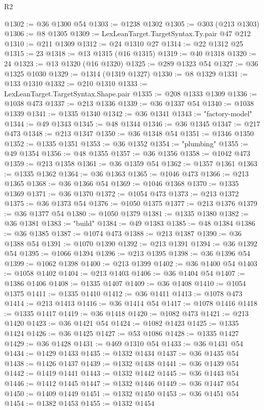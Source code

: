 \begin{lexlean}{R2}
\begin{coremodule}
@1302 := @36 @1300 @54
@1303 := @1238 @1302
@1305 := @303 (@213 @1303)
@1306 := @8 @1305
@1309 := LexLeanTarget.TargetSyntax.Ty.pair @47 @212
@1310 := @211 @1309
@1312 := @24 @1310 @27
@1314 := @22 @1312 @25
@1315 := 23
@1318 := @13 @1315 (@16 @1315)
@1319 := @40 @1318
@1320 := 24
@1323 := @13 @1320 (@16 @1320)
@1325 := @289 @1323 @54
@1327 := @36 @1325 @1030
@1329 := @1314 (@1319 @1327)
@1330 := @8 @1329
@1331 := @133 @1310
@1332 := @210 @1310
@1333 := LexLeanTarget.TargetSyntax.Shape.pair
@1335 := @208 @1333 @1309
@1336 := @1038 @473
@1337 := @213 @1336
@1339 := @36 @1337 @54
@1340 := @1038 @1339
@1341 := @1335 @1340
@1342 := @36 @1341
@1343 := "factory-model"
@1344 := @49 @1343
@1345 := @48 @1344
@1346 := @36 @1345
@1347 := @217 @473
@1348 := @213 @1347
@1350 := @36 @1348 @54
@1351 := @1346 @1350
@1352 := @1335 @1351
@1353 := @36 @1352
@1354 := "plumbing"
@1355 := @49 @1354
@1356 := @48 @1355
@1357 := @36 @1356
@1358 := @1042 @473
@1359 := @213 @1358
@1361 := @36 @1359 @54
@1362 := @1357 @1361
@1363 := @1335 @1362
@1364 := @36 @1363
@1365 := @1046 @473
@1366 := @213 @1365
@1368 := @36 @1366 @54
@1369 := @1046 @1368
@1370 := @1335 @1369
@1371 := @36 @1370
@1372 := @1054 @473
@1373 := @213 @1372
@1375 := @36 @1373 @54
@1376 := @1050 @1375
@1377 := @213 @1376
@1379 := @36 @1377 @54
@1380 := @1050 @1379
@1381 := @1335 @1380
@1382 := @36 @1381
@1383 := "build"
@1384 := @49 @1383
@1385 := @48 @1384
@1386 := @36 @1385
@1387 := @1074 @473
@1388 := @213 @1387
@1390 := @36 @1388 @54
@1391 := @1070 @1390
@1392 := @213 @1391
@1394 := @36 @1392 @54
@1395 := @1066 @1394
@1396 := @213 @1395
@1398 := @36 @1396 @54
@1399 := @1062 @1398
@1400 := @213 @1399
@1402 := @36 @1400 @54
@1403 := @1058 @1402
@1404 := @213 @1403
@1406 := @36 @1404 @54
@1407 := @1386 @1406
@1408 := @1335 @1407
@1409 := @36 @1408
@1410 := @1054 @1375
@1411 := @1335 @1410
@1412 := @36 @1411
@1413 := @1078 @473
@1414 := @213 @1413
@1416 := @36 @1414 @54
@1417 := @1078 @1416
@1418 := @1335 @1417
@1419 := @36 @1418
@1420 := @1082 @473
@1421 := @213 @1420
@1423 := @36 @1421 @54
@1424 := @1082 @1423
@1425 := @1335 @1424
@1426 := @36 @1425
@1427 := @53 @1086
@1428 := @1335 @1427
@1429 := @36 @1428
@1431 := @469 @1310 @54
@1433 := @36 @1431 @54
@1434 := @1429 @1433
@1435 := @1332 @1434
@1437 := @36 @1435 @54
@1438 := @1426 @1437
@1439 := @1332 @1438
@1441 := @36 @1439 @54
@1442 := @1419 @1441
@1443 := @1332 @1442
@1445 := @36 @1443 @54
@1446 := @1412 @1445
@1447 := @1332 @1446
@1449 := @36 @1447 @54
@1450 := @1409 @1449
@1451 := @1332 @1450
@1453 := @36 @1451 @54
@1454 := @1382 @1453
@1455 := @1332 @1454

\end{coremodule}
\end{lexlean}
